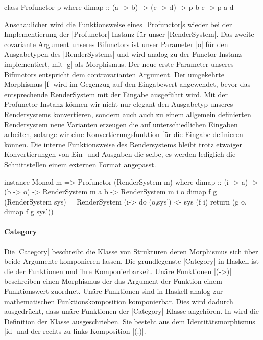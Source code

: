 \begin{haskell}[label={lst:class-profunctor},caption={Profunctor Klasse\protect\footnotemark},nolol,float,floatplacement=H]
class Profunctor p where
  dimap :: (a -> b) -> (c -> d) -> p b c -> p a d
\end{haskell}

Anschaulicher wird die Funktionsweise eines |Profunctor|s wieder bei der Implementierung der |Profunctor| Instanz für unser |RenderSystem|. Das zweite covariante Argument unseres Bifunctors ist unser Parameter |o| für den Ausgabetypen des |RenderSystems| und wird analog zu der Functor Instanz implementiert, mit |g| als Morphismus. Der neue erste Parameter unseres Bifunctors entspricht dem contravarianten Argument. Der umgekehrte Morphismus |f| wird im Gegenzug auf den Eingabewert angewendet, bevor das entsprechende RenderSystem mit der Eingabe ausgeführt wird. Mit der Profunctor Instanz können wir nicht nur elegant den Ausgabetyp unseres Rendersystems konvertieren, sondern auch auch zu einem allgemein definierten Rendersystem neue Varianten erzeugen die auf unterschiedlichen Eingaben arbeiten, solange wir eine Konvertierungsfunktion für die Eingabe definieren können. Die interne Funktionsweise des Rendersystems bleibt trotz etwaiger Konvertierungen von Ein- und Ausgaben die selbe, es werden lediglich die Schnittstellen einem externen Format angepasst.

\begin{haskell}[label={lst:rendersystem-profunctor},caption={Profunctor Instanz für RenderSystem}]
instance Monad m => Profunctor (RenderSystem m) where
  dimap :: (i -> a) -> (b -> o) -> RenderSystem m a b -> RenderSystem m i o
  dimap f g (RenderSystem sys) = RenderSystem (\i -> do
    (o,sys') <- sys (f i)
    return (g o, dimap f g sys'))
\end{haskell}



\paragraph{Category}

Die |Category| beschreibt die Klasse von Strukturen deren Morphismus sich über beide Argumente komponieren lassen. Die grundlegenste |Category| in Haskell ist die der Funktionen und ihre Komponierbarkeit. Unäre Funktionen |(->)| beschreiben einen Morphismus der das Argument der Funktion einem Funktionswert zuordnet. Unäre Funktionen sind in Haskell analog zur mathematischen Funktionskomposition komponierbar. Dies wird dadurch ausgedrückt, dass unäre Funktionen der |Category| Klasse angehören. In  wird die Definition der Klasse ausgeschrieben. Sie besteht aus dem Identitätsmorphismus |id| und der rechts zu links Komposition |(.)|.

